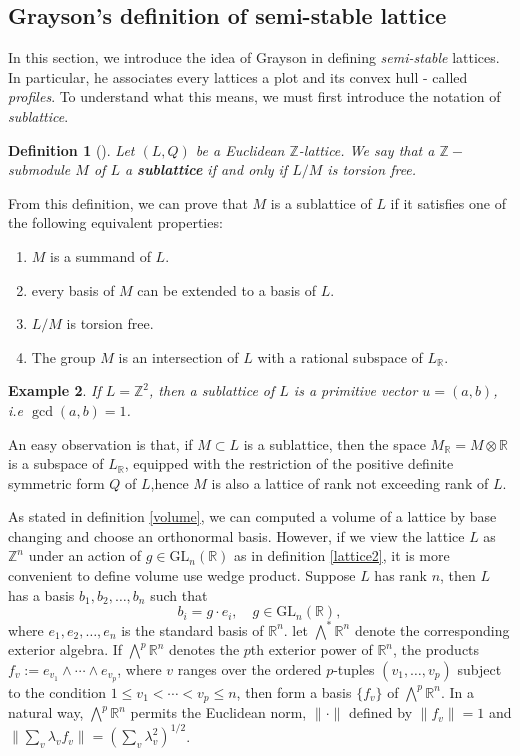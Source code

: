 \documentclass[12pt]{article} %
\newtheorem{definition}{Definition}[section]
\newtheorem{example}[definition]{Example}
\begin{document}
\subsection{Grayson's definition of semi-stable lattice}
In this section, we introduce the idea of Grayson in defining \textit{semi-stable} lattices.
In particular, he associates every lattices a plot and its convex hull - called \textit{ profiles}. To understand
what this means, we must first introduce the notation of \textit{sublattice}.
\begin{definition}[\label=sublattice]
    Let $(L,Q)$ be a Euclidean $\mathbb{Z}$-lattice. We say that a $\mathbb{Z}-$submodule $M$ of
    $L$ a \textbf{sublattice} if and only if $L/M$ is torsion free.
\end{definition}
From this definition, we can prove that $M$ is a sublattice of $L$ if it satisfies one of the
following equivalent properties:
\begin{enumerate}
    \item $M$ is a summand of $L$.
    \item every basis of $M$ can be extended to a basis of $L$.
    \item $L/M$ is torsion free.
    \item The group $M$ is an intersection of $L$ with a rational subspace of $L_\mathbb{R}$.
\end{enumerate}
\begin{example}
    If $L = \mathbb{Z}^2$, then a sublattice of $L$ is a primitive vector $u = (a,b)$, i.e
    $\gcd(a,b)=1$.
\end{example} 
An easy observation is that, if $M \subset L$ is a sublattice, then the space $M_\mathbb{R} = M \otimes \mathbb{R}$
is a subspace of $L_\mathbb{R}$, equipped with the restriction of the positive definite symmetric form $Q$ of $L$,hence $M$
is also a lattice of rank not exceeding rank of $L$.

As stated in definition \ref{volume}, we can computed a volume of a lattice by base changing and
choose an orthonormal basis. However, if we view the lattice $L$ as $\mathbb{Z}^n$ under an action
of $g \in \text{GL}_n(\mathbb{R})$ as in definition \ref{lattice2}, it is more convenient to define volume use wedge  product.
Suppose $L$ has rank $n$, then $L$ has a basis $b_1,b_2,\ldots,b_n$ such that
\[b_i = g \cdot e_i, \quad g \in \text{GL}_n(\mathbb{R}),\]
where $e_1,e_2,\ldots,e_n$ is the standard basis of $\mathbb{R}^n$. let $\bigwedge^* \mathbb{R}^n$ denote the corresponding exterior algebra. If $\bigwedge^p \mathbb{R}^n$ denotes the $p$th exterior power of $\mathbb{R}^n$, the products $f_v := e_{v_1} \wedge \cdots \wedge e_{v_p}$, where $v$ ranges over the ordered $p$-tuples $(v_1, \ldots, v_p)$ subject to the condition $1 \leq v_1 < \cdots < v_p \leq n$, then form a basis $\{f_v\}$ of $\bigwedge^p \mathbb{R}^n$. In a natural way, $\bigwedge^p \mathbb{R}^n$ permits the Euclidean norm, $\lVert \cdot \rVert$ defined by $\lVert f_v \rVert = 1$ and $\lVert \sum_v \lambda_v f_v \rVert = \left( \sum_v \lambda_v^2 \right)^{1/2}$.
\end{document}
